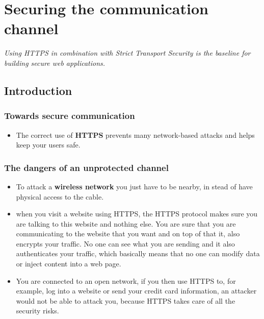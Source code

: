 \documentclass[../main.tex]{subfiles}
\begin{document}
\chapter{Securing the communication channel}
\emph{Using HTTPS in combination with Strict Transport Security is the baseline for building secure
web applications.}

\section{Introduction}
\subsection{Towards secure communication}
\begin{itemize}
\item The correct use of \textbf{HTTPS} prevents many network-based attacks and helps keep your users safe.
\end{itemize}

\subsection{The dangers of an unprotected channel}
\begin{itemize}
\item To attack a \textbf{wireless network} you just have to be nearby, in stead of have physical access to the cable.
\item when you visit a website using HTTPS, the HTTPS protocol makes sure you are talking to this website and nothing else. You are sure that you are communicating to the website that you want and on top of that it, also encrypts your traffic. No one can see what you are sending and it also authenticates your traffic, which basically means that no one can modify data or inject content into a web page. 
\item You are connected to an open network, if you then use HTTPS to, for example, log into a website or send your credit card information, an attacker would not be able to attack you, because HTTPS takes care of all the security risks.
\end{itemize}
\end{document}
